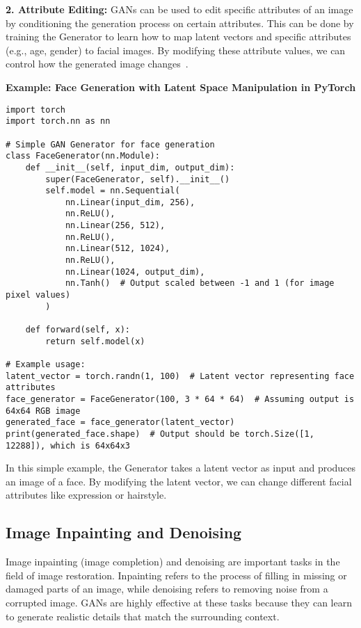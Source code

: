\textbf{2. Attribute Editing:}  
GANs can be used to edit specific attributes of an image by conditioning the generation process on certain attributes. This can be done by training the Generator to learn how to map latent vectors and specific attributes (e.g., age, gender) to facial images. By modifying these attribute values, we can control how the generated image changes~\cite{abdal2019image2stylegan}.

\textbf{Example: Face Generation with Latent Space Manipulation in PyTorch}

\begin{lstlisting}[style=python]
import torch
import torch.nn as nn

# Simple GAN Generator for face generation
class FaceGenerator(nn.Module):
    def __init__(self, input_dim, output_dim):
        super(FaceGenerator, self).__init__()
        self.model = nn.Sequential(
            nn.Linear(input_dim, 256),
            nn.ReLU(),
            nn.Linear(256, 512),
            nn.ReLU(),
            nn.Linear(512, 1024),
            nn.ReLU(),
            nn.Linear(1024, output_dim),
            nn.Tanh()  # Output scaled between -1 and 1 (for image pixel values)
        )

    def forward(self, x):
        return self.model(x)

# Example usage:
latent_vector = torch.randn(1, 100)  # Latent vector representing face attributes
face_generator = FaceGenerator(100, 3 * 64 * 64)  # Assuming output is 64x64 RGB image
generated_face = face_generator(latent_vector)
print(generated_face.shape)  # Output should be torch.Size([1, 12288]), which is 64x64x3
\end{lstlisting}

In this simple example, the Generator takes a latent vector as input and produces an image of a face. By modifying the latent vector, we can change different facial attributes like expression or hairstyle.

\subsection{Image Inpainting and Denoising}
Image inpainting (image completion) and denoising are important tasks in the field of image restoration. Inpainting refers to the process of filling in missing or damaged parts of an image, while denoising refers to removing noise from a corrupted image. GANs are highly effective at these tasks because they can learn to generate realistic details that match the surrounding context.

